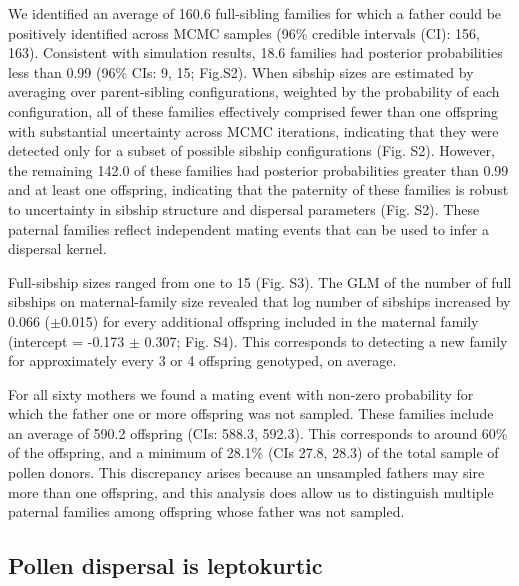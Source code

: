 \documentclass[10pt, a4paper, twocolumn]{article} %
\begin{document}
We identified an average of 160.6 full-sibling families for which a father could be positively identified across MCMC samples (96\% credible intervals (CI): 156, 163).
Consistent with simulation results, 18.6 families had posterior probabilities less than 0.99 (96\% CIs: 9, 15; Fig.S2). 
When sibship sizes are estimated by averaging over parent-sibling configurations, weighted by the probability of each configuration, all of these families effectively comprised fewer than one offspring with substantial uncertainty across MCMC iterations, indicating that they were detected only for a subset of possible sibship configurations (Fig. S2).
However, the remaining 142.0 of these families had posterior probabilities greater than 0.99 and at least one offspring, indicating that the paternity of these families is robust to uncertainty in sibship structure and dispersal parameters (Fig. S2).
These paternal families reflect independent mating events that can be used to infer a dispersal kernel.

Full-sibship sizes ranged from one to 15 (Fig. S3).
The GLM of the number of full sibships on maternal-family size revealed that log number of sibships increased by 0.066 ($\pm$0.015) for every additional offspring included in the maternal family (intercept = -0.173 $\pm$ 0.307; Fig. S4). This corresponds to detecting a new family for approximately every 3 or 4 offspring genotyped, on average.

For all sixty mothers we found a mating event with non-zero probability for which the father one or more offspring was not sampled.
These families include an average of 590.2 offspring (CIs: 588.3, 592.3).
This corresponds to around 60\% of the offspring, and a minimum of 28.1\% (CIs 27.8, 28.3) of the total sample of pollen donors.
This discrepancy arises because an unsampled fathers may sire more than one offspring, and this analysis does allow us to distinguish multiple paternal families among offspring whose father was not sampled.

\subsection{Pollen dispersal is leptokurtic}
\end{document}
